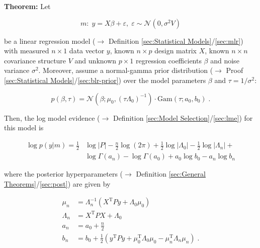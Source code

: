 \documentclass[a4paper,12pt,twoside]{book}
\begin{document}
\textbf{Theorem:} Let

\begin{equation} \label{eq:blr-lme-GLM}
m: \; y = X \beta + \varepsilon, \; \varepsilon \sim \mathcal{N}(0, \sigma^2 V)
\end{equation}

be a linear regression model ($\rightarrow$ Definition \ref{sec:Statistical Models}/\ref{sec:mlr}) with measured $n \times 1$ data vector $y$, known $n \times p$ design matrix $X$, known $n \times n$ covariance structure $V$ and unknown $p \times 1$ regression coefficients $\beta$ and noise variance $\sigma^2$.  Moreover, assume a normal-gamma prior distribution ($\rightarrow$ Proof \ref{sec:Statistical Models}/\ref{sec:blr-prior}) over the model parameters $\beta$ and $\tau = 1/\sigma^2$:

\begin{equation} \label{eq:blr-lme-GLM-NG-prior}
p(\beta,\tau) = \mathcal{N}(\beta; \mu_0, (\tau \Lambda_0)^{-1}) \cdot \mathrm{Gam}(\tau; a_0, b_0) \; .
\end{equation}

Then, the log model evidence ($\rightarrow$ Definition \ref{sec:Model Selection}/\ref{sec:lme}) for this model is

\begin{equation} \label{eq:blr-lme-GLM-NG-LME}
\begin{split}
\log p(y|m) = \frac{1}{2} & \log |P| - \frac{n}{2} \log (2 \pi)  + \frac{1}{2} \log |\Lambda_0| - \frac{1}{2} \log |\Lambda_n| + \\
& \log \Gamma(a_n) - \log \Gamma(a_0) + a_0 \log b_0 - a_n \log b_n
\end{split}
\end{equation}

where the posterior hyperparameters ($\rightarrow$ Definition \ref{sec:General Theorems}/\ref{sec:post}) are given by

\begin{equation} \label{eq:blr-lme-GLM-NG-post-par}
\begin{split}
\mu_n &= \Lambda_n^{-1} (X^\mathrm{T} P y + \Lambda_0 \mu_0) \\
\Lambda_n &= X^\mathrm{T} P X + \Lambda_0 \\
a_n &= a_0 + \frac{n}{2} \\
b_n &= b_0 + \frac{1}{2} (y^\mathrm{T} P y + \mu_0^\mathrm{T} \Lambda_0 \mu_0 - \mu_n^\mathrm{T} \Lambda_n \mu_n) \; .
\end{split}
\end{equation}
\end{document}
